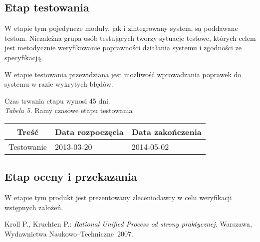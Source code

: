 \documentclass [11pt, a4paper, leqno]	{article}	%
\begin{document}
\subsection{Etap testowania}
\noindent
W etapie tym pojedyncze moduły, jak i zintegrowany system, są poddawane testom. Niezależna grupa osób testujących tworzy sytuacje testowe, których celem jest metodycznie weryfikowanie poprawności działania systemu i zgodności ze specyfikacją.

W etapie testowania przewidziana jest możliwość wprowadzania poprawek do systemu w razie wykrytych błędów. 

Czas trwania etapu wynosi 45 dni. \\

\textit{Tabela 5.} Ramy czasowe etapu testowania

\begin{center}
	\begin{tabular}{| l | l | l |}
		\hline
		\multicolumn{1}{|c|}{Treść} & 
		\multicolumn{1}{|c|}{Data rozpoczęcia} & 
		\multicolumn{1}{|c|}{Data zakończenia} \\ \hline \hline
		Testowanie & 2013-03-20 & 2014-05-02 \\ \hline
	\end{tabular}
\end{center}

\subsection{Etap oceny i przekazania}
\noindent
W etapie tym produkt jest prezentowany zleceniodawcy w celu weryfikacji wstępnych założeń. 

\newpage

\begin{thebibliography}{2}
	 Kroll P., Kruchten P.: \emph{Rational Unified Process od strony praktycznej}. Warszawa, Wydawnictwa Naukowo--Techniczne~2007.
\end{thebibliography}
\end{document}
